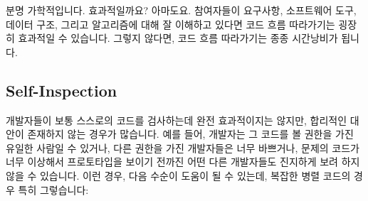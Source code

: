 분명 가학적입니다.
효과적일까요?
아마도요.
참여자들이 요구사항, 소프트웨어 도구, 데이터 구조, 그리고 알고리즘에 대해 잘
이해하고 있다면 코드 흐름 따라가기는 굉장히 효과적일 수 있습니다.
그렇지 않다면, 코드 흐름 따라가기는 종종 시간낭비가 됩니다.

\subsection{Self-Inspection}
\label{sec:debugging:Self-Inspection}

개발자들이 보통 스스로의 코드를 검사하는데 완전 효과적이지는 않지만, 합리적인
대안이 존재하지 않는 경우가 많습니다.
예를 들어, 개발자는 그 코드를 볼 권한을 가진 유일한 사람일 수 있거나, 다른
권한을 가진 개발자들은 너무 바쁘거나, 문제의 코드가 너무 이상해서 프로토타입을
보이기 전까진 어떤 다른 개발자들도 진지하게 보려 하지 않을 수 있습니다.
이런 경우, 다음 수순이 도움이 될 수 있는데, 복잡한 병렬 코드의 경우 특히
그렇습니다:


